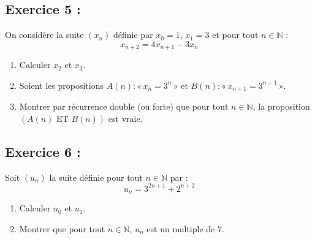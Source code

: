 \documentclass[12pt,a4paper]{article}
\begin{document}
\bigskip

\subsection*{Exercice 5 :}

On considère la suite $(x_n)$ définie par $x_0 = 1$, $x_1 = 3$ et pour tout $n \in \mathbb{N}$ :
\[
x_{n+2} = 4x_{n+1} - 3x_n
\]

\begin{enumerate}
    \item Calculer $x_2$ et $x_3$.
    \item Soient les propositions $A(n) : « \, x_n = 3^n \, »$ et $B(n) : « \, x_{n+1} = 3^{n+1} \, »$.
    \item Montrer par récurrence double (ou forte) que pour tout $n \in \mathbb{N}$, la proposition $(A(n) \text{ ET } B(n))$ est vraie.
\end{enumerate}


\bigskip


\subsection*{Exercice 6 : }

Soit $(u_n)$ la suite définie pour tout $n \in \mathbb{N}$ par :
\[
u_n = 3^{2n+1} + 2^{n+2}
\]

\begin{enumerate}
    \item Calculer $u_0$ et $u_1$.
    \item Montrer que pour tout $n \in \mathbb{N}$, $u_n$ est un multiple de $7$.
\end{enumerate}
\end{document}
